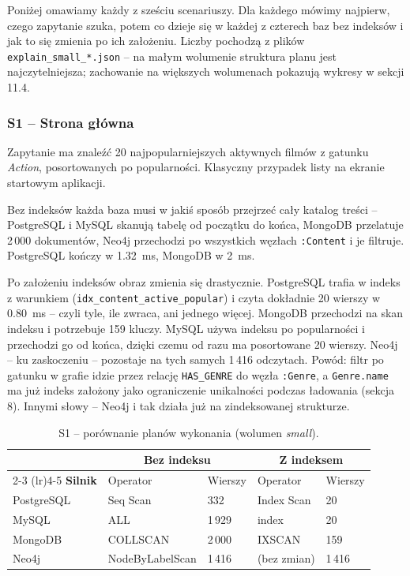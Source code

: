 Poniżej omawiamy każdy z sześciu scenariuszy. Dla każdego mówimy
najpierw, czego zapytanie szuka, potem co dzieje się w każdej
z czterech baz bez indeksów i jak to się zmienia po ich założeniu.
Liczby pochodzą z plików \texttt{explain\_small\_*.json} -- na małym
wolumenie struktura planu jest najczytelniejsza; zachowanie na
większych wolumenach pokazują wykresy w sekcji 11.4.

\subsubsection*{S1 -- Strona główna}

Zapytanie ma znaleźć 20 najpopularniejszych aktywnych filmów z gatunku
\textit{Action}, posortowanych po popularności. Klasyczny przypadek
listy na ekranie startowym aplikacji.

Bez indeksów każda baza musi w jakiś sposób przejrzeć cały katalog
treści -- PostgreSQL i MySQL skanują tabelę od początku do końca,
MongoDB przelatuje 2\,000 dokumentów, Neo4j przechodzi po wszystkich
węzłach \texttt{:Content} i je filtruje. PostgreSQL kończy w 1.32~ms,
MongoDB w 2~ms.

Po założeniu indeksów obraz zmienia się drastycznie. PostgreSQL
trafia w indeks z warunkiem (\texttt{idx\_content\_active\_popular})
i czyta dokładnie 20 wierszy w 0.80~ms -- czyli tyle, ile zwraca,
ani jednego więcej. MongoDB przechodzi na skan indeksu i potrzebuje
159 kluczy. MySQL używa indeksu po popularności i przechodzi go
od końca, dzięki czemu od razu ma posortowane 20 wierszy. Neo4j --
ku zaskoczeniu -- pozostaje na tych samych 1\,416 odczytach. Powód:
filtr po gatunku w grafie idzie przez relację \texttt{HAS\_GENRE}
do węzła \texttt{:Genre}, a \texttt{Genre.name} ma już indeks
założony jako ograniczenie unikalności podczas ładowania (sekcja 8).
Innymi słowy -- Neo4j i tak działa już na zindeksowanej strukturze.

\begin{table}[H]
    \centering
    \small
    \begin{tabular}{lllll}
        \toprule
        & \multicolumn{2}{c}{\textbf{Bez indeksu}} & \multicolumn{2}{c}{\textbf{Z indeksem}} \\
        \cmidrule(lr){2-3} \cmidrule(lr){4-5}
        \textbf{Silnik} & Operator & Wierszy & Operator & Wierszy \\
        \midrule
        PostgreSQL & Seq Scan        & 332   & Index Scan      & 20 \\
        MySQL      & ALL             & 1\,929 & index           & 20 \\
        MongoDB    & COLLSCAN        & 2\,000 & IXSCAN          & 159 \\
        Neo4j      & NodeByLabelScan & 1\,416 & (bez zmian)     & 1\,416 \\
        \bottomrule
    \end{tabular}
    \caption{S1 -- porównanie planów wykonania (wolumen \emph{small}).}
    \label{tab:explain_s1}
\end{table}

